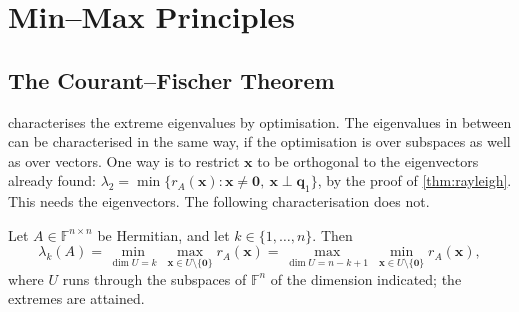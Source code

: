 \begin{table}
\end{table}

\section{Min--Max Principles}
\label{sec:min-max}

\subsection{The Courant--Fischer Theorem}

 characterises the extreme eigenvalues by optimisation. The eigenvalues in between can be characterised in the same way, if the optimisation is over subspaces as well as over vectors. One way is to restrict $\mathbf x$ to be orthogonal to the eigenvectors already found: $\lambda_2=\min\{r_A(\mathbf x):\mathbf x\ne\mathbf 0,\ \mathbf x\perp\mathbf q_1\}$, by the proof of \cref{thm:rayleigh}. This needs the eigenvectors. The following characterisation does not.

\begin{theorem}
\label{thm:courant-fischer}
Let $A\in\mathbb F^{n\times n}$ be Hermitian, and let $k\in\{1,\ldots,n\}$. Then
\[
\lambda_k(A)=\min_{\dim U=k}\ \max_{\mathbf x\in U\setminus\{\mathbf 0\}}r_A(\mathbf x)=\max_{\dim U=n-k+1}\ \min_{\mathbf x\in U\setminus\{\mathbf 0\}}r_A(\mathbf x),
\]
where $U$ runs through the subspaces of $\mathbb F^n$ of the dimension indicated; the extremes are attained.
\end{theorem}

